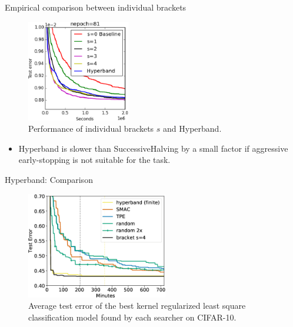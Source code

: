 \begin{frame}{Empirical comparison between individual brackets}
\begin{figure}
    \centering
    \includegraphics[width=0.4\textwidth]{w07_hpo_grey_box/images/hyperband/Hyperband_figure_3.png}
    \caption{Performance of individual brackets $s$ and Hyperband.}
\end{figure}
\begin{itemize}
    \item Hyperband is slower than SuccessiveHalving by a small factor if aggressive early-stopping is not suitable for the task.
\end{itemize}

    
\end{frame}

\begin{frame}{Hyperband: Comparison}
\begin{figure}
    \centering
    \includegraphics[width=0.55\textwidth]{w07_hpo_grey_box/images/hyperband/Figure_experiments.png}
    \caption{Average test error of the best kernel regularized least square classification model found by each searcher on CIFAR-10.}
\end{figure}

    
\end{frame}

